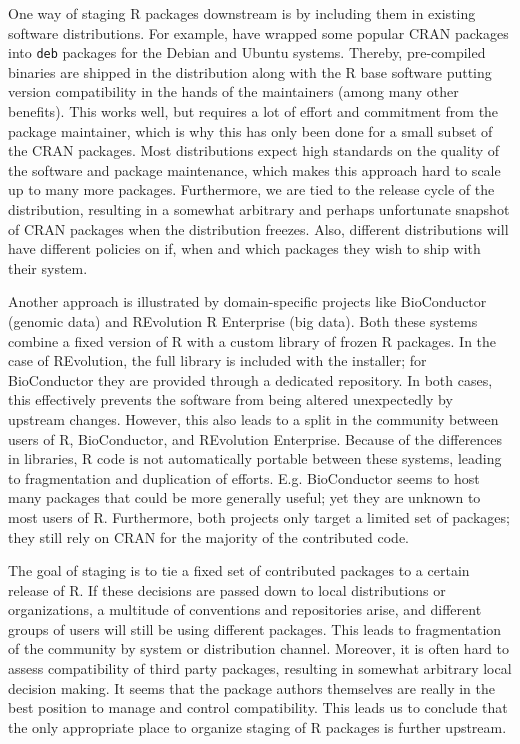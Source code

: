 One way of staging R packages downstream is by including them in existing
software distributions. For example, \citet{cran2deb} have wrapped some popular
CRAN packages into \texttt{deb} packages for the Debian and Ubuntu systems.
Thereby, pre-compiled binaries are shipped in the distribution along with the R
base software putting version compatibility in the hands of the maintainers
(among many other benefits).
This works well, but requires a lot of effort and commitment from the package
maintainer, which is why this has only been done for a small subset of the CRAN
packages. Most distributions expect high standards on the quality of the
software and package maintenance, which makes this approach hard to scale up to
many more packages. Furthermore, we are tied to the release cycle of the
distribution, resulting in a somewhat arbitrary and perhaps unfortunate
snapshot of CRAN packages when the distribution freezes. Also, different
distributions will have different policies on if, when and which packages they
wish to ship with their system.

Another approach is illustrated by domain-specific projects like BioConductor
(genomic data) and REvolution R Enterprise (big data). Both these systems
combine a fixed version of R with a custom library of frozen R packages. In
the case of REvolution, the full library is included with the installer; for
BioConductor they are provided through a dedicated repository. In both cases,
this effectively prevents the software from being altered unexpectedly by
upstream changes. However, this also leads to a split in the community between
users of R, BioConductor, and REvolution Enterprise. Because of the differences
in libraries, R code is not automatically portable between these systems,
leading to fragmentation and duplication of efforts. E.g. BioConductor seems to
host many packages that could be more generally useful; yet they are unknown to
most users of R. Furthermore, both projects only target a limited set of
packages; they still rely on CRAN for the majority of the contributed code.

The goal of staging is to tie a fixed set of contributed packages to a certain
release of R. If these decisions are passed down to local distributions or
organizations, a multitude of conventions and repositories arise, and different
groups of users will still be using different packages. This leads to
fragmentation of the community by system or distribution channel. Moreover, it
is often hard to assess compatibility of third party packages, resulting in
somewhat arbitrary local decision making. It seems that the package authors
themselves are really in the best position to manage and control compatibility.
This leads us to conclude that the only appropriate place to organize staging
of R packages is further upstream.


